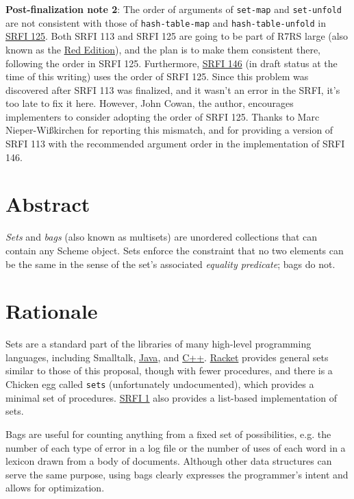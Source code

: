 \textbf{Post-finalization note 2}: The order of arguments of
\texttt{set-map} and \texttt{set-unfold} are not consistent with those
of \texttt{hash-table-map} and \texttt{hash-table-unfold} in
\href{https://srfi.schemers.org/srfi-125/}{SRFI 125}. Both SRFI 113 and
SRFI 125 are going to be part of R7RS large (also known as the
\href{http://trac.sacrideo.us/wg/wiki/RedEdition}{Red Edition}), and the
plan is to make them consistent there, following the order in SRFI 125.
Furthermore, \href{https://srfi.schemers.org/srfi-146/}{SRFI 146} (in
draft status at the time of this writing) uses the order of SRFI 125.
Since this problem was discovered after SRFI 113 was finalized, and it
wasn't an error in the SRFI, it's too late to fix it here. However, John
Cowan, the author, encourages implementers to consider adopting the
order of SRFI 125. Thanks to Marc Nieper-Wißkirchen for reporting this
mismatch, and for providing a version of SRFI 113 with the recommended
argument order in the implementation of SRFI 146.

\section{Abstract}\label{abstract}

\emph{Sets} and \emph{bags} (also known as multisets) are unordered
collections that can contain any Scheme object. Sets enforce the
constraint that no two elements can be the same in the sense of the
set's associated \emph{equality predicate}; bags do not.

\section{Rationale}\label{rationale}

Sets are a standard part of the libraries of many high-level programming
languages, including Smalltalk,
\href{http://docs.oracle.com/javase/6/docs/api/java/util/Set.html}{Java},
and \href{http://www.cplusplus.com/reference/set/set/}{C++}.
\href{http://docs.racket-lang.org/reference/sets.html}{Racket} provides
general sets similar to those of this proposal, though with fewer
procedures, and there is a Chicken egg called \texttt{sets}
(unfortunately undocumented), which provides a minimal set of
procedures. \href{http://srfi.schemers.org/srfi-1/srfi-1.html}{SRFI 1}
also provides a list-based implementation of sets.

Bags are useful for counting anything from a fixed set of possibilities,
e.g. the number of each type of error in a log file or the number of
uses of each word in a lexicon drawn from a body of documents. Although
other data structures can serve the same purpose, using bags clearly
expresses the programmer's intent and allows for optimization.


